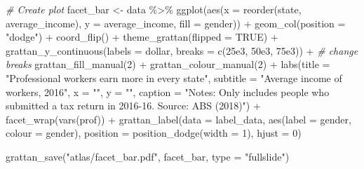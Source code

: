 \documentclass[
]{book}
\newenvironment{Shaded}{\begin{snugshade}}{\end{snugshade}}
\newcommand{\AttributeTok}[1]{\textcolor[rgb]{0.77,0.63,0.00}{#1}}
\newcommand{\CommentTok}[1]{\textcolor[rgb]{0.56,0.35,0.01}{\textit{#1}}}
\newcommand{\ConstantTok}[1]{\textcolor[rgb]{0.00,0.00,0.00}{#1}}
\newcommand{\DecValTok}[1]{\textcolor[rgb]{0.00,0.00,0.81}{#1}}
\newcommand{\FloatTok}[1]{\textcolor[rgb]{0.00,0.00,0.81}{#1}}
\newcommand{\FunctionTok}[1]{\textcolor[rgb]{0.00,0.00,0.00}{#1}}
\newcommand{\NormalTok}[1]{#1}
\newcommand{\OtherTok}[1]{\textcolor[rgb]{0.56,0.35,0.01}{#1}}
\newcommand{\SpecialCharTok}[1]{\textcolor[rgb]{0.00,0.00,0.00}{#1}}
\newcommand{\StringTok}[1]{\textcolor[rgb]{0.31,0.60,0.02}{#1}}
\begin{document}
\begin{Shaded}
\begin{Highlighting}[]
\CommentTok{\# Create plot}
\NormalTok{facet\_bar }\OtherTok{\textless{}{-}}\NormalTok{ data }\SpecialCharTok{\%\textgreater{}\%} 
  \FunctionTok{ggplot}\NormalTok{(}\FunctionTok{aes}\NormalTok{(}\AttributeTok{x =} \FunctionTok{reorder}\NormalTok{(state, average\_income),}
             \AttributeTok{y =}\NormalTok{ average\_income,}
             \AttributeTok{fill =}\NormalTok{ gender)) }\SpecialCharTok{+} 
  \FunctionTok{geom\_col}\NormalTok{(}\AttributeTok{position =} \StringTok{"dodge"}\NormalTok{) }\SpecialCharTok{+} 
  \FunctionTok{coord\_flip}\NormalTok{() }\SpecialCharTok{+} 
  \FunctionTok{theme\_grattan}\NormalTok{(}\AttributeTok{flipped =} \ConstantTok{TRUE}\NormalTok{) }\SpecialCharTok{+} 
  \FunctionTok{grattan\_y\_continuous}\NormalTok{(}\AttributeTok{labels =}\NormalTok{ dollar,}
                       \AttributeTok{breaks =} \FunctionTok{c}\NormalTok{(}\FloatTok{25e3}\NormalTok{, }\FloatTok{50e3}\NormalTok{, }\FloatTok{75e3}\NormalTok{)) }\SpecialCharTok{+}  \CommentTok{\# change breaks}
  \FunctionTok{grattan\_fill\_manual}\NormalTok{(}\DecValTok{2}\NormalTok{) }\SpecialCharTok{+} 
  \FunctionTok{grattan\_colour\_manual}\NormalTok{(}\DecValTok{2}\NormalTok{) }\SpecialCharTok{+} 
  \FunctionTok{labs}\NormalTok{(}\AttributeTok{title =} \StringTok{"Professional workers earn more in every state"}\NormalTok{,}
       \AttributeTok{subtitle =} \StringTok{"Average income of workers, 2016"}\NormalTok{,}
       \AttributeTok{x =} \StringTok{""}\NormalTok{,}
       \AttributeTok{y =} \StringTok{""}\NormalTok{,}
       \AttributeTok{caption =} \StringTok{"Notes: Only includes people who submitted a tax return in 2016{-}16. Source: ABS (2018)"}\NormalTok{) }\SpecialCharTok{+} 
  \FunctionTok{facet\_wrap}\NormalTok{(}\FunctionTok{vars}\NormalTok{(prof)) }\SpecialCharTok{+} 
  \FunctionTok{grattan\_label}\NormalTok{(}\AttributeTok{data =}\NormalTok{ label\_data,}
                \FunctionTok{aes}\NormalTok{(}\AttributeTok{label =}\NormalTok{ gender,}
                    \AttributeTok{colour =}\NormalTok{ gender),}
                \AttributeTok{position =} \FunctionTok{position\_dodge}\NormalTok{(}\AttributeTok{width =} \DecValTok{1}\NormalTok{), }
                \AttributeTok{hjust =} \DecValTok{0}\NormalTok{)}
\end{Highlighting}
\end{Shaded}

\begin{Shaded}
\begin{Highlighting}[]
\FunctionTok{grattan\_save}\NormalTok{(}\StringTok{"atlas/facet\_bar.pdf"}\NormalTok{, facet\_bar, }\AttributeTok{type =} \StringTok{"fullslide"}\NormalTok{)}
\end{Highlighting}
\end{Shaded}
\end{document}
